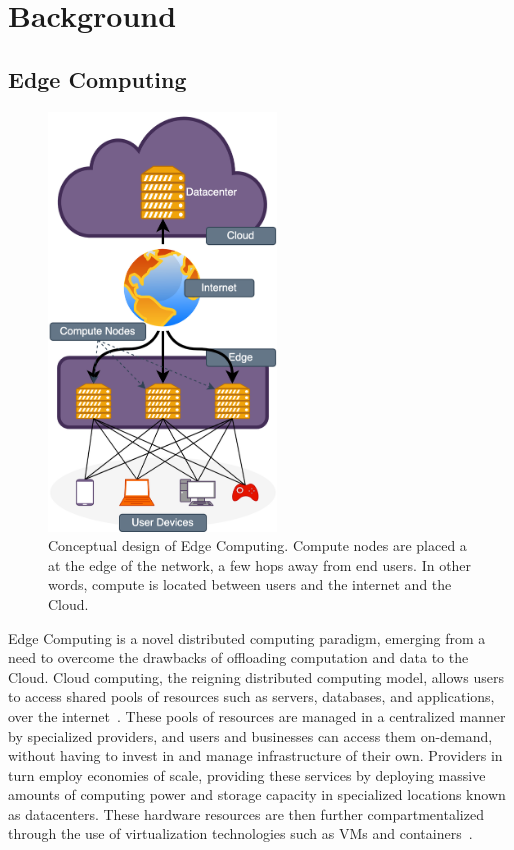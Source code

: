 \section{Background}

\subsection{Edge Computing}
\glsresetall%

\begin{figure}
    \centering
    \includegraphics[height=30em]{figures/edgecomputing}
    \caption{%
        Conceptual design of Edge Computing.
        Compute nodes are placed a at the edge of the network, a few hops away from end users.
        In other words, compute is located between users and the internet and the Cloud.
    }\label{fig:edgecomputing}
\end{figure}


Edge Computing is a novel distributed computing paradigm, emerging from a need to overcome the drawbacks of offloading computation and data to the Cloud.
Cloud computing, the reigning distributed computing model, allows users to access shared pools of resources such as servers, databases, and applications, over the internet~\cite{gai2012towards}.
These pools of resources are managed in a centralized manner by specialized providers, and users and businesses can access them on-demand, without having to invest in and manage infrastructure of their own.
Providers in turn employ economies of scale, providing these services by deploying massive amounts of computing power and storage capacity in specialized locations known as datacenters.
These hardware resources are then further compartmentalized through the use of virtualization technologies such as \glspl{VM} and containers~\cite{gai2012towards}.

